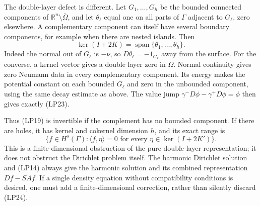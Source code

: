 \documentclass[
  11pt,
]{article}
\makeatletter
\let\ReaderOriginalAnchorStart\hyper@anchorstart
\let\ReaderOriginalAnchorEnd\hyper@anchorend
\let\ReaderPendingAliases\@empty
\def\ReaderArmAliases#1{\gdef\ReaderPendingAliases{#1}}
\def\hyper@anchorstart#1{\ReaderIfNativeAnchorTF{#1}{\ReaderPendingAliases\global\let\ReaderPendingAliases\@empty}{}\ReaderOriginalAnchorStart{#1}}
\makeatother
\begin{document}
The double-layer defect is different. Let \(G_1,\ldots,G_h\) be the
bounded connected components of \(\mathbb R^n\setminus\overline\Omega\),
and let \(\theta_\ell\) equal one on all parts of \(\Gamma\) adjacent to
\(G_\ell\), zero elsewhere. A complementary component can itself have
several boundary components, for example when there are nested islands.
Then \[
 \ker(I+2K)=\operatorname{span}\{\theta_1,\ldots,\theta_h\}.
 \tag{LP23}
\] Indeed the normal out of \(G_\ell\) is \(-\nu\), so
\(D\theta_\ell=-1_{G_\ell}\) away from the surface. For the converse, a
kernel vector gives a double layer zero in \(\Omega\). Normal continuity
gives zero Neumann data in every complementary component. Its energy
makes the potential constant on each bounded \(G_\ell\) and zero in the
unbounded component, using the same decay estimate as above. The value
jump \(\gamma^-D\phi-\gamma^+D\phi=\phi\) then gives exactly (LP23).

Thus (LP19) is invertible if the complement has no bounded component. If
there are holes, it has kernel and cokernel dimension \(h\), and its
exact range is \[
 \{f\in H^s(\Gamma):\langle f,\eta\rangle=0
       \text{ for every }\eta\in\ker(I+2K')\}.
 \tag{LP24}
\] This is a finite-dimensional obstruction of the pure double-layer
representation; it does not obstruct the Dirichlet problem itself. The
harmonic Dirichlet solution and (LP14) always give the harmonic solution
and its combined representation \(Df-SAf\). If a single density equation
without compatibility conditions is desired, one must add a
finite-dimensional correction, rather than silently discard (LP24).

\ReaderArmAliases{\ReaderOriginalAnchorStart{AN03-SBD-015}\ReaderOriginalAnchorEnd\begingroup\expandafter\def\csname @currentHref\endcsname{AN03-SBD-015}\label{AN03-SBD-015}\endgroup\ReaderOriginalAnchorStart{an03-sbd-015-the-logarithmic-constant-and-two-diagnostic-calculations}\ReaderOriginalAnchorEnd\begingroup\expandafter\def\csname @currentHref\endcsname{an03-sbd-015-the-logarithmic-constant-and-two-diagnostic-calculations}\label{an03-sbd-015-the-logarithmic-constant-and-two-diagnostic-calculations}\endgroup\ReaderOriginalAnchorStart{15-the-logarithmic-constant-and-two-diagnostic-calculations}\ReaderOriginalAnchorEnd\begingroup\expandafter\def\csname @currentHref\endcsname{15-the-logarithmic-constant-and-two-diagnostic-calculations}\label{15-the-logarithmic-constant-and-two-diagnostic-calculations}\endgroup\ReaderOriginalAnchorStart{the-logarithmic-constant-and-two-diagnostic-calculations}\ReaderOriginalAnchorEnd}
\end{document}
